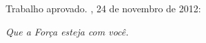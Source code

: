 \documentclass[
	12pt,				%
	openright,			%
	twoside,			%
	a4paper,			%
	english,			%
	french,				%
	spanish,			%
	brazil				%
	]{abntex2}
\begin{document}
%
% 
%
\begin{folhadeaprovacao}

  \begin{center}
    {\ABNTEXchapterfont\large\imprimirautor}

    \vspace*{\fill}\vspace*{\fill}
    \begin{center}
      \ABNTEXchapterfont\bfseries\Large\imprimirtitulo
    \end{center}
    \vspace*{\fill}
    
    \hspace{.45\textwidth}
    \begin{minipage}{.5\textwidth}
        \imprimirpreambulo
    \end{minipage}%
    \vspace*{\fill}
   \end{center}
        
   Trabalho aprovado. \imprimirlocal, 24 de novembro de 2012:

      
   \begin{center}
    \vspace*{0.5cm}
    {\large\imprimirlocal}
    \par
    {\large\imprimirdata}
    \vspace*{1cm}
  \end{center}
  
\end{folhadeaprovacao}

\begin{dedicatoria}
   \vspace*{\fill}
   \centering
   \noindent
   \textit{Que a Força esteja com você.} \vspace*{\fill}
\end{dedicatoria}
\end{document}
